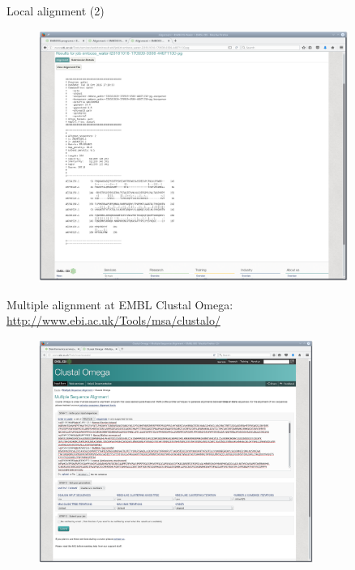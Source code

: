 \documentclass[pdf]{beamer}
\begin{document}
\begin{frame}{Local alignment (2)}
  \begin{figure}[ht]
    \includegraphics[width=0.9\textwidth]{images/emboss_water_result}
  \end{figure}
\end{frame}

\begin{frame}{Multiple alignment at EMBL}
  Clustal Omega: \url{http://www.ebi.ac.uk/Tools/msa/clustalo/}
  \begin{figure}[ht]
    \includegraphics[width=0.8\textwidth]{images/ebi_clustalo}
  \end{figure}
\end{frame}
\end{document}
